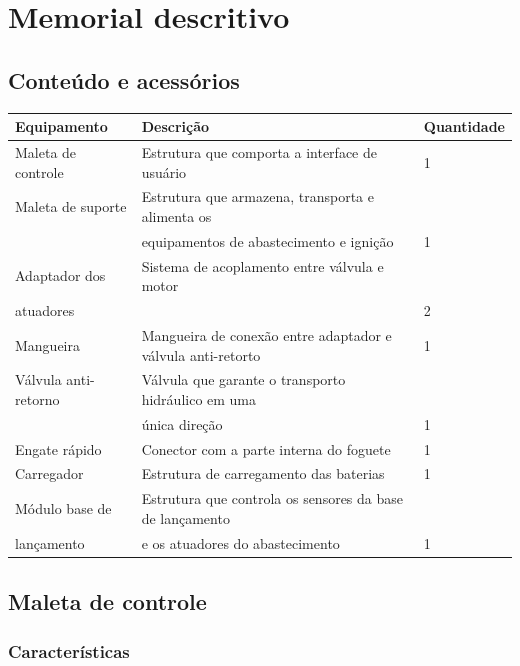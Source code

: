 \chapter{Memorial descritivo}

\section*{Conteúdo e acessórios}

\begin{table}[H]
\centering
\begin{tabular}{|l|l|l|}
\hline
Equipamento & Descrição  & Quantidade \\ \hline
Maleta de controle & Estrutura que comporta a interface de usuário & 1 \\ \hline
Maleta de suporte & Estrutura que armazena, transporta e alimenta os & \\ & equipamentos de abastecimento e ignição  & 1 \\ \hline
Adaptador dos & Sistema de acoplamento entre válvula e motor & \\ atuadores & & 2 \\ \hline
Mangueira & Mangueira de conexão entre adaptador e válvula anti-retorto & 1 \\ \hline
Válvula anti-retorno & Válvula que garante o transporto hidráulico em uma & \\ & única direção & 1 \\ \hline
Engate rápido & Conector com a parte interna do foguete & 1 \\ \hline
Carregador & Estrutura de carregamento das baterias & 1 \\ \hline
Módulo base de & Estrutura que controla os sensores da base de lançamento & \\ lançamento & e os atuadores do abastecimento & 1 \\ \hline
\end{tabular}
\end{table}

\section*{Maleta de controle}

\subsection*{Características}

